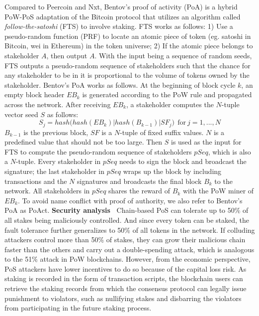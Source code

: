 Compared to Peercoin and Nxt, Bentov's proof of activity (PoA)  
is a hybrid PoW-PoS adaptation of the Bitcoin protocol that utilizes an algorithm called \textit{follow-the-satoshi} (FTS) to involve staking. 
FTS works as follows: 1) Use a pseudo-random function (PRF) to locate an atomic piece of token (eg. satoshi in Bitcoin, wei in Ethereum) in the token universe; 2) If the atomic piece belongs to stakeholder $A$, then output $A$. With the input being a sequence of random seeds, FTS outputs a pseudo-random sequence of stakeholders such that the chance for any stakeholder to be in it is proportional to the volume of tokens owned by the stakeholder.
Bentov's PoA works as follows. At the beginning of block cycle $k$, an empty block header $EB_k$ is generated according to the PoW rule and propagated across the network. After receiving $EB_k$, a stakeholder computes the $N$-tuple vector seed $S$ as follows:
\begin{equation*}
    S_j=hash\Big(hash(EB_k)|hash(B_{k-1})|SF_j\Big) ~~\text{for}~j=1,...,N
\end{equation*}
$B_{k-1}$ is the previous block, $SF$ is a $N$-tuple of fixed suffix values. $N$ is a predefined value that should not be too large. Then $S$ is used as the input for FTS to compute the pseudo-random sequence of stakeholders $pSeq$, which is also a $N$-tuple. Every stakeholder in $pSeq$ needs to sign the block and broadcast the signature; the last stakeholder in $pSeq$ wraps up the block by including transactions and the $N$ signatures and broadcasts the final block $B_k$ to the network. All stakeholders in $pSeq$ shares the reward of $B_k$ with the PoW miner of $EB_k$.
To avoid name conflict with proof of authority, we also refer to Bentov's PoA as PoAct.
\textbf{Security analysis~} Chain-based PoS can tolerate up to 50\% of all stakes being maliciously controlled. And since every token can be staked, the fault tolerance further generalizes to 50\% of all tokens in the network. If colluding attackers control more than 50\% of stakes, they can grow their malicious chain faster than the others and carry out a double-spending attack, which is analogous to the 51\% attack in PoW blockchains. However, from the economic perspective, PoS attackers have lower incentives to do so because of the capital loss risk. As staking is recorded in the form of transaction scripts, the blockchain users can retrieve the staking records from which the consensus protocol can legally issue punishment to violators, such as nullifying stakes and disbarring the violators from participating in the future staking process.

